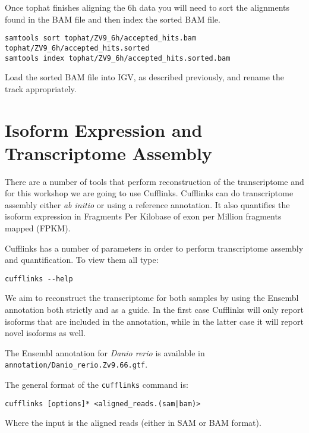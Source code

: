\begin{steps}
Once tophat finishes aligning the 6h data you will need to sort the alignments found in the BAM file and then index the
sorted BAM file.

\begin{lstlisting}
samtools sort tophat/ZV9_6h/accepted_hits.bam tophat/ZV9_6h/accepted_hits.sorted
samtools index tophat/ZV9_6h/accepted_hits.sorted.bam
\end{lstlisting}

Load the sorted BAM file into IGV, as described previously, and rename the track appropriately.
\end{steps}

\newpage
\section{Isoform Expression and Transcriptome Assembly}
There are a number of tools that perform reconstruction of the transcriptome
and for this workshop we are going to use Cufflinks. Cufflinks can do
transcriptome assembly either \textit{ab initio} or using a reference annotation. It
also quantifies the isoform expression in Fragments
Per Kilobase of exon per Million fragments mapped (FPKM).

\begin{steps}
Cufflinks has a number of parameters in order to perform transcriptome
assembly and quantification. To view them all type:

\begin{lstlisting}
cufflinks --help
\end{lstlisting}
\end{steps}

We aim to reconstruct the transcriptome for both samples by using the Ensembl
annotation both strictly and as a guide. In the first case Cufflinks will only
report isoforms that are included in the annotation, while in the latter case
it will report novel isoforms as well.

The Ensembl annotation for \textit{Danio rerio} is available in
\texttt{annotation/Danio\_rerio.Zv9.66.gtf}.

\begin{information}
The general format of the \texttt{cufflinks} command is:
\begin{lstlisting}[style=command_syntax]
cufflinks [options]* <aligned_reads.(sam|bam)>
\end{lstlisting}
Where the input is the aligned reads (either in SAM or BAM format).
\end{information}

